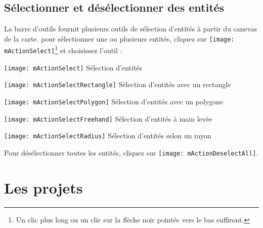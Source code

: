 \subsection{Sélectionner et désélectionner des entités}\label{sec:selection}

La barre d'outils fournit plusieurs outils de sélection d'entités à partir du 
canevas de la carte. pour sélectionner une ou plusieurs entités, cliquez  sur 
\texttt{[image: mActionSelect]}\footnote{Un clic plus long ou un 
clic sur la flèche noir pointée vers le bas suffiront.} et choisissez l'outil :

\begin{description}
\item \texttt{[image: mActionSelect]} Sélection d'entités
\item \texttt{[image: mActionSelectRectangle]} Sélection d'entités avec un rectangle
\item \texttt{[image: mActionSelectPolygon]} Sélection d'entités avec un polygone
\item \texttt{[image: mActionSelectFreehand]} Sélection d'entités à main levée
\item \texttt{[image: mActionSelectRadius]} Sélection d'entités selon un rayon
\end{description} 

Pour désélectionner toutes les entités, cliquez sur \texttt{[image: mActionDeselectAll]}.

\section{Les projets} \label{sec:projects} 

